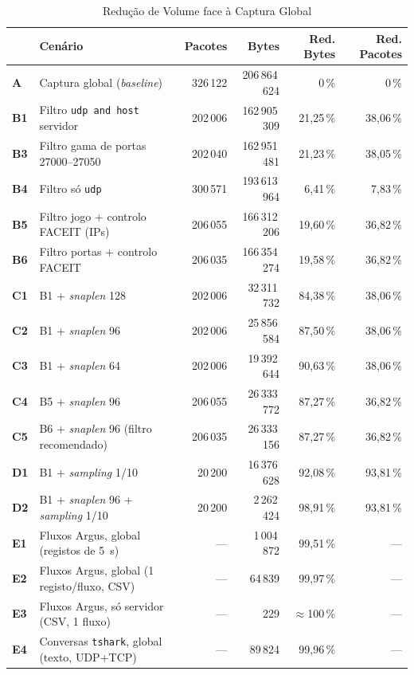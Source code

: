 \documentclass[11pt,a4paper]{article}
\begin{document}
\begin{table}[htbp]
\centering
\caption{Redução de Volume face à Captura Global}\label{tab:red}
\footnotesize
\begin{tabularx}{\linewidth}{@{}>{\bfseries}lXrrrr@{}}
\toprule
 & \textbf{Cenário} & \textbf{Pacotes} & \textbf{Bytes} & \textbf{Red. Bytes} & \textbf{Red. Pacotes}\\
\midrule
A  & Captura global (\emph{baseline})                          & 326\,122 & 206\,864\,624 & 0\,\%     & 0\,\%\\
B1 & Filtro \texttt{udp and host} servidor                     & 202\,006 & 162\,905\,309 & 21,25\,\% & 38,06\,\%\\
B3 & Filtro gama de portas 27000--27050                        & 202\,040 & 162\,951\,481 & 21,23\,\% & 38,05\,\%\\
B4 & Filtro só \texttt{udp}                                    & 300\,571 & 193\,613\,964 &  6,41\,\% &  7,83\,\%\\
B5 & Filtro jogo + controlo FACEIT (IPs)                       & 206\,055 & 166\,312\,206 & 19,60\,\% & 36,82\,\%\\
B6 & Filtro portas + controlo FACEIT                           & 206\,035 & 166\,354\,274 & 19,58\,\% & 36,82\,\%\\
C1 & B1 + \emph{snaplen} 128                                   & 202\,006 &  32\,311\,732 & 84,38\,\% & 38,06\,\%\\
C2 & B1 + \emph{snaplen} 96                                    & 202\,006 &  25\,856\,584 & 87,50\,\% & 38,06\,\%\\
C3 & B1 + \emph{snaplen} 64                                    & 202\,006 &  19\,392\,644 & 90,63\,\% & 38,06\,\%\\
C4 & B5 + \emph{snaplen} 96                                    & 206\,055 &  26\,333\,772 & 87,27\,\% & 36,82\,\%\\
C5 & B6 + \emph{snaplen} 96 (filtro recomendado)               & 206\,035 &  26\,333\,156 & 87,27\,\% & 36,82\,\%\\
D1 & B1 + \emph{sampling} 1/10                                 &  20\,200 &  16\,376\,628 & 92,08\,\% & 93,81\,\%\\
D2 & B1 + \emph{snaplen} 96 + \emph{sampling} 1/10             &  20\,200 &   2\,262\,424 & 98,91\,\% & 93,81\,\%\\
E1 & Fluxos Argus, global (registos de 5~s)                    & --- &   1\,004\,872 & 99,51\,\% & ---\\
E2 & Fluxos Argus, global (1 registo/fluxo, CSV)               & --- &      64\,839 & 99,97\,\% & ---\\
E3 & Fluxos Argus, só servidor (CSV, 1 fluxo)                  & --- &         229 & $\approx$100\,\% & ---\\
E4 & Conversas \texttt{tshark}, global (texto, UDP+TCP)        & --- &      89\,824 & 99,96\,\% & ---\\
\bottomrule
\end{tabularx}
\end{table}
\end{document}
